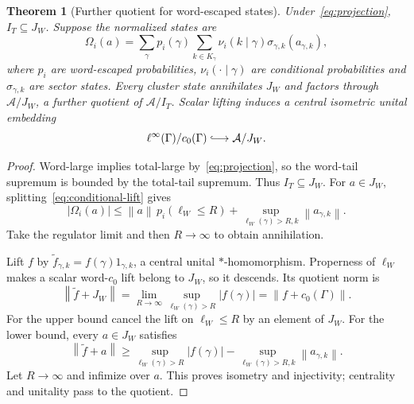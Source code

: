 \documentclass[11pt]{article}
\newtheorem{theorem}{Theorem}[section]
\theoremstyle{definition}
\newcommand{\A}{\mathcal A}
\newcommand{\norm}[1]{\left\lVert#1\right\rVert}
\begin{document}
\begin{theorem}[Further quotient for word-escaped states]
\label{thm:word-quotient}
Under~\eqref{eq:projection}, $I_T\subseteq J_W$.
Suppose the normalized states are
\begin{equation}
 \Omega_i(a)=\sum_\gamma p_i(\gamma)
 \sum_{k\in K_\gamma}\nu_i(k\mid\gamma)
                 \sigma_{\gamma,k}(a_{\gamma,k}),
 \label{eq:conditional-lift}
\end{equation}
where $p_i$ are word-escaped probabilities, $\nu_i(\cdot\mid\gamma)$ are conditional probabilities and $\sigma_{\gamma,k}$ are sector states.
Every cluster state annihilates $J_W$ and factors through $\A/J_W$, a further quotient of $\A/I_T$.
Scalar lifting induces a central isometric unital embedding
\begin{equation}
 \ell^\infty(\Gamma)/c_0(\Gamma)\lhook\joinrel\longrightarrow\A/J_W.
 \label{eq:word-embedding}
\end{equation}
\end{theorem}
\begin{proof}
Word-large implies total-large by~\eqref{eq:projection}, so the word-tail supremum is bounded by the total-tail supremum.
Thus $I_T\subseteq J_W$.
For $a\in J_W$, splitting~\eqref{eq:conditional-lift} gives
\begin{equation}
 |\Omega_i(a)|\leq\norm a\,p_i(\ell_W\leq R)
       +\sup_{\ell_W(\gamma)>R,k}\norm{a_{\gamma,k}}.
\end{equation}
Take the regulator limit and then $R\to\infty$ to obtain annihilation.

Lift $f$ by $\widetilde f_{\gamma,k}=f(\gamma)1_{\gamma,k}$, a central unital $*$-homomorphism.
Properness of $\ell_W$ makes a scalar word-$c_0$ lift belong to $J_W$, so it descends.
Its quotient norm is
\begin{equation}
 \norm{\widetilde f+J_W}
 =\lim_{R\to\infty}\sup_{\ell_W(\gamma)>R}|f(\gamma)|
 =\norm{f+c_0(\Gamma)}.
 \label{eq:quotient-norm}
\end{equation}
For the upper bound cancel the lift on $\ell_W\leq R$ by an element of $J_W$.
For the lower bound, every $a\in J_W$ satisfies
\begin{equation}
 \norm{\widetilde f+a}\geq
 \sup_{\ell_W(\gamma)>R}|f(\gamma)|
 -\sup_{\ell_W(\gamma)>R,k}\norm{a_{\gamma,k}}.
\end{equation}
Let $R\to\infty$ and infimize over $a$.
This proves isometry and injectivity; centrality and unitality pass to the quotient.
\end{proof}
\end{document}

